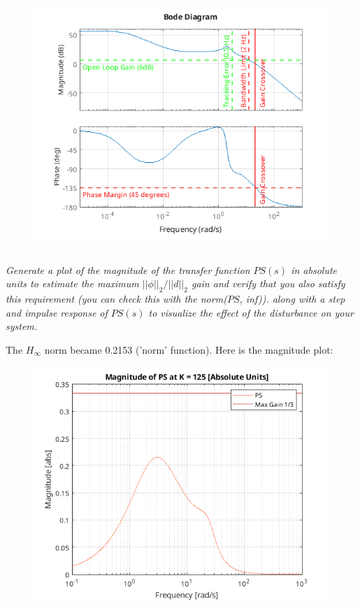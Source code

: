 \documentclass{article}
\begin{document}
\begin{figure}[H]
    \centering
    \includegraphics[width=\textwidth]{k125bode.png}
\end{figure}

\subsection{}
\textit{Generate a plot of the magnitude of the transfer function $PS(s)$ in absolute units to estimate the maximum $||\phi||_2/||d||_2$ gain and verify that you also satisfy this requirement (you can check this with the norm($PS$, inf)). along with a step and impulse response of $PS(s)$ to visualize the effect of the disturbance on your system.}

The $H_{\infty}$ norm became 0.2153 ('norm' function).
Here is the magnitude plot:

\begin{figure}[H]
    \centering
    \includegraphics[width=\textwidth]{psk125.png}
\end{figure}
\end{document}
